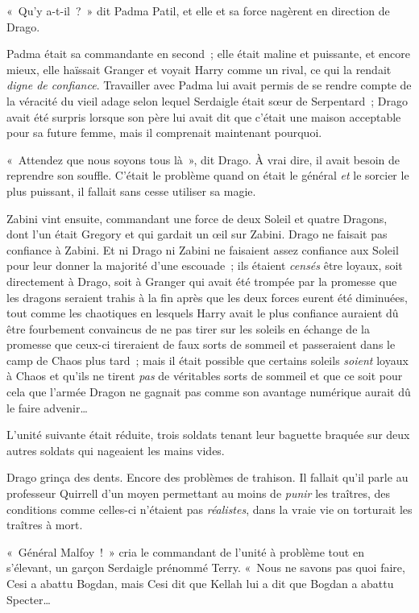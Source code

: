 «~Qu'y a-t-il~?~» dit Padma Patil, et elle et sa force nagèrent en direction de Drago.

Padma était sa commandante en second~; elle était maline et puissante, et encore mieux, elle haïssait Granger et voyait Harry comme un rival, ce qui la rendait \emph{digne de confiance}. Travailler avec Padma lui avait permis de se rendre compte de la véracité du vieil adage selon lequel Serdaigle était sœur de Serpentard~; Drago avait été surpris lorsque son père lui avait dit que c'était une maison acceptable pour sa future femme, mais il comprenait maintenant pourquoi.

«~Attendez que nous soyons tous là~», dit Drago. À vrai dire, il avait besoin de reprendre son souffle. C'était le problème quand on était le général \emph{et} le sorcier le plus puissant, il fallait sans cesse utiliser sa magie.

Zabini vint ensuite, commandant une force de deux Soleil et quatre Dragons, dont l'un était Gregory et qui gardait un œil sur Zabini. Drago ne faisait pas confiance à Zabini. Et ni Drago ni Zabini ne faisaient assez confiance aux Soleil pour leur donner la majorité d'une escouade~; ils étaient \emph{censés} être loyaux, soit directement à Drago, soit à Granger qui avait été trompée par la promesse que les dragons seraient trahis à la fin après que les deux forces eurent été diminuées, tout comme les chaotiques en lesquels Harry avait le plus confiance auraient dû être fourbement convaincus de ne pas tirer sur les soleils en échange de la promesse que ceux-ci tireraient de faux sorts de sommeil et passeraient dans le camp de Chaos plus tard~; mais il était possible que certains soleils \emph{soient} loyaux à Chaos et qu'ils ne tirent \emph{pas} de véritables sorts de sommeil et que ce soit pour cela que l'armée Dragon ne gagnait pas comme son avantage numérique aurait dû le faire advenir…

L'unité suivante était réduite, trois soldats tenant leur baguette braquée sur deux autres soldats qui nageaient les mains vides.

Drago grinça des dents. Encore des problèmes de trahison. Il fallait qu'il parle au professeur Quirrell d'un moyen permettant au moins de \emph{punir} les traîtres, des conditions comme celles-ci n'étaient pas \emph{réalistes}, dans la vraie vie on torturait les traîtres à mort.

«~Général Malfoy~!~» cria le commandant de l'unité à problème tout en s'élevant, un garçon Serdaigle prénommé Terry. «~Nous ne savons pas quoi faire, Cesi a abattu Bogdan, mais Cesi dit que Kellah lui a dit que Bogdan a abattu Specter…

